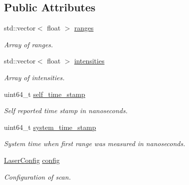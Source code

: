 \subsection*{Public Attributes}
\begin{DoxyCompactItemize}
\item 
std\+::vector$<$ float $>$ \hyperlink{struct_laser_scan_a4d059cb77f0f9f6e558db50c9993f7df}{ranges}\hypertarget{struct_laser_scan_a4d059cb77f0f9f6e558db50c9993f7df}{}\label{struct_laser_scan_a4d059cb77f0f9f6e558db50c9993f7df}

\begin{DoxyCompactList}\small\item\em Array of ranges. \end{DoxyCompactList}\item 
std\+::vector$<$ float $>$ \hyperlink{struct_laser_scan_a6e68040137d787ef7ef47580d147c503}{intensities}\hypertarget{struct_laser_scan_a6e68040137d787ef7ef47580d147c503}{}\label{struct_laser_scan_a6e68040137d787ef7ef47580d147c503}

\begin{DoxyCompactList}\small\item\em Array of intensities. \end{DoxyCompactList}\item 
uint64\+\_\+t \hyperlink{struct_laser_scan_ad37e2a54c7eff58cad7576d51916b859}{self\+\_\+time\+\_\+stamp}\hypertarget{struct_laser_scan_ad37e2a54c7eff58cad7576d51916b859}{}\label{struct_laser_scan_ad37e2a54c7eff58cad7576d51916b859}

\begin{DoxyCompactList}\small\item\em Self reported time stamp in nanoseconds. \end{DoxyCompactList}\item 
uint64\+\_\+t \hyperlink{struct_laser_scan_a1bb6b997ce698fbc516bc20ab3ba3399}{system\+\_\+time\+\_\+stamp}\hypertarget{struct_laser_scan_a1bb6b997ce698fbc516bc20ab3ba3399}{}\label{struct_laser_scan_a1bb6b997ce698fbc516bc20ab3ba3399}

\begin{DoxyCompactList}\small\item\em System time when first range was measured in nanoseconds. \end{DoxyCompactList}\item 
\hyperlink{struct_laser_config}{Laser\+Config} \hyperlink{struct_laser_scan_a5c7dd0b85432e62cf319f2ad4ec058b4}{config}\hypertarget{struct_laser_scan_a5c7dd0b85432e62cf319f2ad4ec058b4}{}\label{struct_laser_scan_a5c7dd0b85432e62cf319f2ad4ec058b4}

\begin{DoxyCompactList}\small\item\em Configuration of scan. \end{DoxyCompactList}\end{DoxyCompactItemize}


